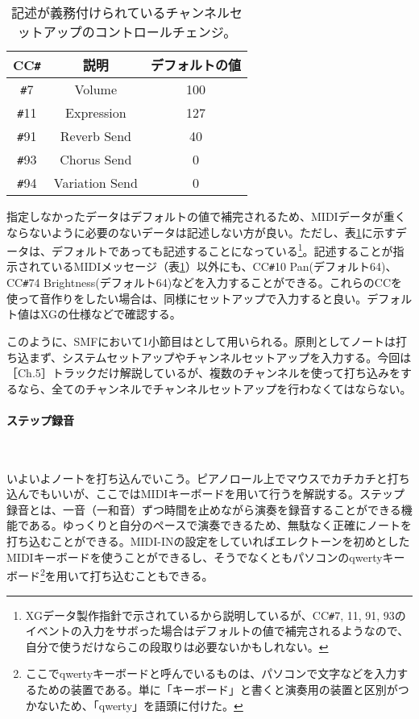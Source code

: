 \documentclass[uplatex, 10pt, dvipdfmx]{jsarticle}
\numberwithin{equation}{section}
\newcommand{\emphj}[1]{\textbf{\textrm{\textgt{{#1}}}}}
\begin{document}
\begin{table}[htbp]
  \caption{記述が義務付けられているチャンネルセットアップのコントロールチェンジ\cite{XG指針}。}
  \label{tabXGchannelsetup}
  \centering
  \begin{tabular}{ccc}
  CC\texttt{\#} & 説明 & デフォルトの値\cite{XG仕様}\\
  \hline
  \texttt{\#}7 & Volume & 100 \\
  \texttt{\#}11 & Expression & 127 \\
  \texttt{\#}91 & Reverb Send & 40 \\
  \texttt{\#}93 & Chorus Send & 0\\
  \texttt{\#}94 & Variation Send\footnotemark & 0\\
  \hline
  \end{tabular}
\end{table}

指定しなかったデータはデフォルトの値で補完されるため、MIDIデータが重くならないように必要のないデータは記述しない方が良い。ただし、表\ref{tabXGchannelsetup}に示すデータは、デフォルトであっても記述することになっている\footnote{XGデータ製作指針\cite{XG指針}で示されているから説明しているが、CC\texttt{\#}7, 11, 91, 93のイベントの入力をサボった場合はデフォルトの値で補完されるようなので、自分で使うだけならこの段取りは必要ないかもしれない。}。記述することが指示されているMIDIメッセージ（表\ref{tabXGchannelsetup}）以外にも、CC\texttt{\#}10 Pan(デフォルト64)、CC\texttt{\#}74 Brightness(デフォルト64)などを入力することができる。これらのCCを使って音作りをしたい場合は、同様にセットアップで入力すると良い。デフォルト値はXGの仕様\cite{XG仕様}などで確認する。

このように、SMFにおいて1小節目は\emphj{セットアップ小節}として用いられる。原則としてノートは打ち込まず、システムセットアップやチャンネルセットアップを入力する。今回は［Ch.5］トラックだけ解説しているが、複数のチャンネルを使って打ち込みをするなら、全てのチャンネルでチャンネルセットアップを行わなくてはならない。

\paragraph{ステップ録音} \ 

いよいよノートを打ち込んでいこう。ピアノロール上でマウスでカチカチと打ち込んでもいいが、ここではMIDIキーボードを用いて行う\emphj{ステップ録音}を解説する。ステップ録音とは、一音（一和音）ずつ時間を止めながら演奏を録音することができる機能である。ゆっくりと自分のペースで演奏できるため、無駄なく正確にノートを打ち込むことができる。MIDI-INの設定をしていればエレクトーンを初めとしたMIDIキーボードを使うことができるし、そうでなくともパソコンのqwertyキーボード\footnote{ここでqwertyキーボードと呼んでいるものは、パソコンで文字などを入力するための装置である。単に「キーボード」と書くと演奏用の装置と区別がつかないため、「qwerty」を語頭に付けた。}を用いて打ち込むこともできる。
\end{document}
